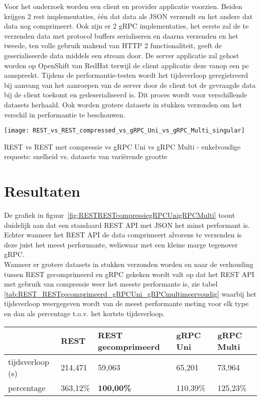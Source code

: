 \documentclass[a0,portrait]{hogent-poster}
\begin{document}
\begin{multicols}{2}
Voor het onderzoek worden een client en provider applicatie voorzien.
Beiden krijgen 2 rest implementaties, één dat data als JSON verzendt en het andere dat data nog comprimeert.
Ook zijn er 2 gRPC implementaties, het eerste zal de te verzenden data met protocol buffers serialiseren en daarna verzenden en het tweede,
ten volle gebruik makend van HTTP 2 functionaliteit, geeft de geserialiseerde data middels een stream door.
De server applicatie zal gehost worden op OpenShift van RedHat terwijl de client applicatie deze vanop een pc aanspreekt.
Tijdens de performantie-testen wordt het tijdsverloop geregistreerd bij aanvang van het aanroepen van de server door de client
tot de gevraagde data bij de client toekomt en gedeserialiseerd is. Dit proces wordt voor verschillende datasets herhaald.
Ook worden grotere datasets in stukken verzonden om het verschil in performantie te beschouwen.\\

\begin{center}
  \captionsetup{type=figure}
  \texttt{[image: REST\_vs\_REST\_compressed\_vs\_gRPC\_Uni\_vs\_gRPC\_Multi\_singular]}
  \caption{REST vs REST met compressie vs gRPC Uni vs gRPC Multi - enkelvoudige requests: snelheid vs. datasets van vari\"erende grootte}
  \label{fig:RESTRESTcompressiegRPCUnigRPCMulti}
\end{center}

\section{Resultaten}

De grafiek in figuur~\ref{fig:RESTRESTcompressiegRPCUnigRPCMulti} toont duidelijk aan dat een standaard REST API met JSON het minst performant is. Echter wanneer het REST API
de data comprimeert alvorens te verzenden is deze juist het meest performante, weliswaar met een kleine marge tegenover gRPC.\\
Wanneer er grotere datasets in stukken verzonden worden en naar de verhouding tussen REST gecomprimeerd en gRPC gekeken wordt valt op dat het REST API met gebruik van compressie
weer het meeste performante is, zie tabel \ref{tab:REST_RESTgecomprimeerd_gRPCUni_gRPCmultimeervoudig} waarbij het tijdsverloop weergegeven wordt van de
meest performante meting voor elk type en dan als percentage t.o.v. het kortste tijdsverloop.\\

\begin{center}
  \begin{tabular}{lllll}
    \toprule
    \textbf{} & \textbf{REST} & \textbf{REST gecomprimeerd} & \textbf{gRPC Uni} & \textbf{gRPC Multi} \\
    \midrule
    tijdsverloop (s) & 214,471 & 59,063 & 65,201 & 73,964 \\
    percentage & 363,12\% & \textbf{100,00\%} & 110,39\% & 125,23\% \\
    \bottomrule
  \end{tabular}
  \label{tab:REST_RESTgecomprimeerd_gRPCUni_gRPCmultimeervoudig}
\end{center}


\end{multicols}
\end{document}
